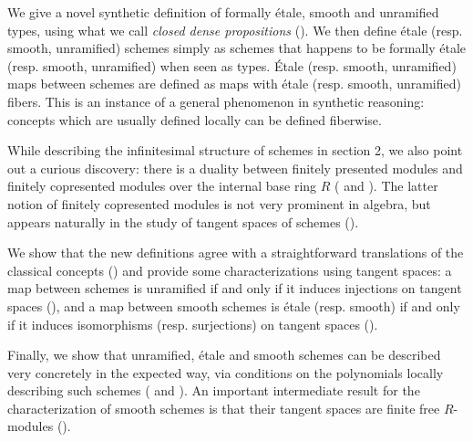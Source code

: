 We give a novel synthetic definition of formally étale, smooth and unramified types, using what we call \emph{closed dense propositions} (). We then define étale (resp. smooth, unramified) schemes simply as schemes that happens to be formally étale (resp. smooth, unramified) when seen as types. Étale (resp. smooth, unramified) maps between schemes are defined as maps with étale (resp. smooth, unramified) fibers.
This is an instance of a general phenomenon in synthetic reasoning: concepts which are usually defined locally can be defined fiberwise. %

While describing the infinitesimal structure of schemes in section 2, we also point out a curious discovery: there is a duality between finitely presented modules and finitely copresented modules over the internal base ring $R$ ( and ).
The latter notion of finitely copresented modules is not very prominent in algebra, but appears naturally in the study of tangent spaces of schemes ().

We show that the new definitions agree with a straightforward translations of the classical concepts () and provide some characterizations using tangent spaces:
a map between schemes is unramified if and only if it induces injections on tangent spaces (), and a map between smooth schemes is étale (resp. smooth) if and only if it induces isomorphisms (resp. surjections) on tangent spaces ().

Finally, we show that unramified, étale and smooth schemes can be described very concretely in the expected way, via conditions on the polynomials locally describing such schemes ( and ). An important intermediate result for the characterization of smooth schemes is that their tangent spaces are finite free $R$-modules ().
